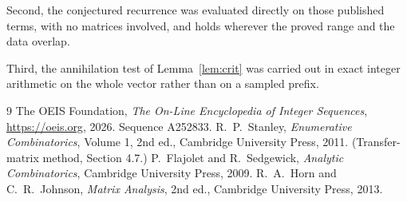 \documentclass[11pt,a4paper]{article}
\theoremstyle{plain}
\theoremstyle{definition}
\begin{document}
Second, the conjectured recurrence was evaluated directly on those published terms, with no
matrices involved, and holds wherever the proved range and the data overlap.

Third, the annihilation test of Lemma~\ref{lem:crit} was carried out in exact integer
arithmetic on the whole vector rather than on a sampled prefix.

\begin{thebibliography}{9}
 The OEIS Foundation, \emph{The On-Line Encyclopedia of Integer
Sequences}, \url{https://oeis.org}, 2026. Sequence A252833.
 R.~P.~Stanley, \emph{Enumerative Combinatorics}, Volume 1, 2nd ed.,
Cambridge University Press, 2011. (Transfer-matrix method, Section 4.7.)
 P.~Flajolet and R.~Sedgewick, \emph{Analytic Combinatorics}, Cambridge
University Press, 2009.
 R.~A.~Horn and C.~R.~Johnson, \emph{Matrix Analysis}, 2nd ed., Cambridge
University Press, 2013.
\end{thebibliography}
\end{document}
